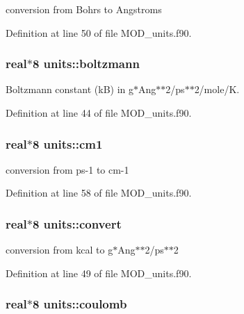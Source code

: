 conversion from Bohrs to Angstroms 



Definition at line 50 of file M\-O\-D\-\_\-units.\-f90.

\hypertarget{classunits_acd591c79c4ec7abdaa2bed6d0918be75}{
\subsubsection[{boltzmann}]{\setlength{\rightskip}{0pt plus 5cm}real$\ast$8 units\-::boltzmann}}\label{classunits_acd591c79c4ec7abdaa2bed6d0918be75}


Boltzmann constant (k\-B) in g$\ast$\-Ang$\ast$$\ast$2/ps$\ast$$\ast$2/mole/\-K. 



Definition at line 44 of file M\-O\-D\-\_\-units.\-f90.

\hypertarget{classunits_a58a7d872bc2e8e7e49778fb46387004a}{
\subsubsection[{cm1}]{\setlength{\rightskip}{0pt plus 5cm}real$\ast$8 units\-::cm1}}\label{classunits_a58a7d872bc2e8e7e49778fb46387004a}


conversion from ps-\/1 to cm-\/1 



Definition at line 58 of file M\-O\-D\-\_\-units.\-f90.

\hypertarget{classunits_a5faccb1252257c20c6e82f552be722e5}{
\subsubsection[{convert}]{\setlength{\rightskip}{0pt plus 5cm}real$\ast$8 units\-::convert}}\label{classunits_a5faccb1252257c20c6e82f552be722e5}


conversion from kcal to g$\ast$\-Ang$\ast$$\ast$2/ps$\ast$$\ast$2 



Definition at line 49 of file M\-O\-D\-\_\-units.\-f90.

\hypertarget{classunits_a5989b95d691cf998bec4bc3774ffb951}{
\subsubsection[{coulomb}]{\setlength{\rightskip}{0pt plus 5cm}real$\ast$8 units\-::coulomb}}\label{classunits_a5989b95d691cf998bec4bc3774ffb951}


